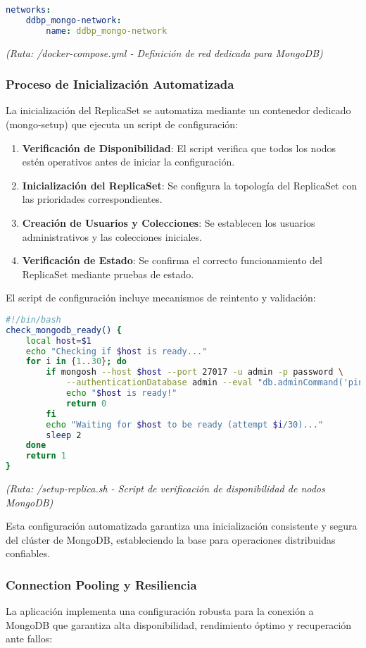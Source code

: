\documentclass[12pt,letterpaper]{article}
\begin{document}
\begin{lstlisting}[language=yaml]
networks:
    ddbp_mongo-network:
        name: ddbp_mongo-network
\end{lstlisting}
\textit{(Ruta: /docker-compose.yml - Definición de red dedicada para MongoDB)}

\subsubsection{Proceso de Inicialización Automatizada}
La inicialización del ReplicaSet se automatiza mediante un contenedor dedicado (mongo-setup) que ejecuta un script de configuración:

\begin{enumerate}
    \item \textbf{Verificación de Disponibilidad}: El script verifica que todos los nodos estén operativos antes de iniciar la configuración.
    \item \textbf{Inicialización del ReplicaSet}: Se configura la topología del ReplicaSet con las prioridades correspondientes.
    \item \textbf{Creación de Usuarios y Colecciones}: Se establecen los usuarios administrativos y las colecciones iniciales.
    \item \textbf{Verificación de Estado}: Se confirma el correcto funcionamiento del ReplicaSet mediante pruebas de estado.
\end{enumerate}

El script de configuración incluye mecanismos de reintento y validación:

\begin{lstlisting}[language=bash]
#!/bin/bash
check_mongodb_ready() {
    local host=$1
    echo "Checking if $host is ready..."
    for i in {1..30}; do
        if mongosh --host $host --port 27017 -u admin -p password \
            --authenticationDatabase admin --eval "db.adminCommand('ping')" &>/dev/null; then
            echo "$host is ready!"
            return 0
        fi
        echo "Waiting for $host to be ready (attempt $i/30)..."
        sleep 2
    done
    return 1
}
\end{lstlisting}
\textit{(Ruta: /setup-replica.sh - Script de verificación de disponibilidad de nodos MongoDB)}

Esta configuración automatizada garantiza una inicialización consistente y segura del clúster de MongoDB, estableciendo la base para operaciones distribuidas confiables.

\subsubsection{Connection Pooling y Resiliencia}
La aplicación implementa una configuración robusta para la conexión a MongoDB que garantiza alta disponibilidad, rendimiento óptimo y recuperación ante fallos:
\end{document}
